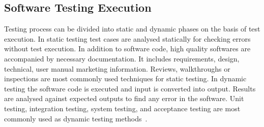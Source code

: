







\subsection{Software Testing Execution}
Testing process can be divided into static and dynamic phases on the basis of test execution. In static testing test cases are analysed statically for checking errors without test execution. In addition to software code, high quality softwares are accompanied by necessary documentation. It includes requirements, design, technical, user manual marketing information. Reviews, walkthroughs or inspections are most commonly used techniques for static testing. In dynamic testing the software code is executed and input is converted into output. Results are analysed against expected outputs to find any error in the software. Unit testing, integration testing, system testing, and acceptance testing are most commonly used as dynamic testing methods~\cite{fairley1978tutorial}.

